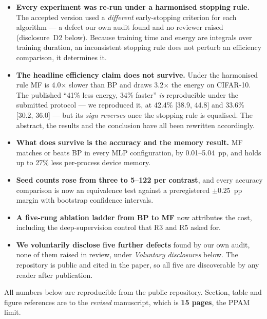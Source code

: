\documentclass[11pt,a4paper]{article}
\newcommand{\MF}{MF}
\newcommand{\BP}{BP}
\begin{document}
\begin{itemize}[nosep,leftmargin=1.4em]
  \item \textbf{Every experiment was re-run under a harmonised stopping rule.}
        The accepted version used a \emph{different} early-stopping criterion
        for each algorithm --- a defect our own audit found and no reviewer
        raised (disclosure~D2 below). Because training time and energy are
        integrals over training duration, an inconsistent stopping rule does
        not perturb an efficiency comparison, it determines it.
  \item \textbf{The headline efficiency claim does not survive.} Under the
        harmonised rule \MF{} is \num{4.0}$\times$ slower than \BP{} and draws
        \num{3.2}$\times$ the energy on CIFAR-10. The published
        ``\num{41}\% less energy, \num{34}\% faster'' \emph{is} reproducible
        under the submitted protocol --- we reproduced it, at
        \num{42.4}\% [\num{38.9}, \num{44.8}] and \num{33.6}\%
        [\num{30.2}, \num{36.0}] --- but its \emph{sign reverses} once the
        stopping rule is equalised. The abstract, the results and the
        conclusion have all been rewritten accordingly.
  \item \textbf{What does survive is the accuracy and the memory result.}
        \MF{} matches or beats \BP{} in every MLP configuration, by
        \numrange{0.01}{5.04}~pp, and holds up to \num{27}\% less per-process
        device memory.
  \item \textbf{Seed counts rose from three to \numrange{5}{122} per
        contrast}, and every accuracy comparison is now an equivalence test
        against a preregistered $\pm\num{0.25}$~pp margin with bootstrap
        confidence intervals.
  \item \textbf{A five-rung ablation ladder from \BP{} to \MF{}} now
        attributes the cost, including the deep-supervision control that R3
        and R5 asked for.
  \item \textbf{We voluntarily disclose five further defects} found by our own
        audit, none of them raised in review, under \emph{Voluntary
        disclosures} below. The repository is public and cited in the paper, so
        all five are discoverable by any reader after publication.
\end{itemize}

\noindent
All numbers below are reproducible from the public repository. Section,
table and figure references are to the \emph{revised} manuscript, which is
\textbf{15 pages}, the PPAM limit.
\end{document}
